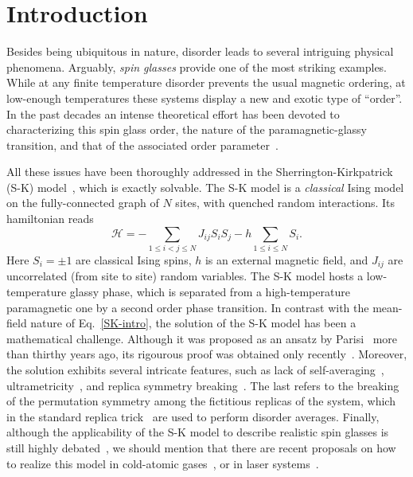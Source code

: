 \documentclass[twocolumn,superscriptaddress,prb,10pt]{revtex4-1}
\begin{document}
\section{Introduction}


Besides being ubiquitous in nature, disorder leads to several intriguing 
physical phenomena. Arguably, \emph{spin glasses} provide one of the most 
striking examples. While at any finite temperature disorder prevents the 
usual magnetic ordering, at low-enough temperatures these systems display a 
new and exotic type of ``order''. In the past decades an intense theoretical 
effort has been devoted to characterizing this spin glass order, the nature of 
the paramagnetic-glassy transition, and that of the associated order 
parameter~\cite{binder-1986,parisi-book,young-1998,nishimori-book,castellani-2005}. 

All these issues have been thoroughly addressed in the Sherrington-Kirkpatrick 
(S-K) model~\cite{sherrington-1978,sherrington-1978-prl}, which is exactly 
solvable. The S-K model is a \emph{classical} Ising model on the fully-connected 
graph of $N$ sites, with quenched random interactions. Its hamiltonian reads  
%
\begin{equation}
{\mathcal H}=-\sum\limits_{1\le i<j\le N}J_{ij}S_i S_j-
h\sum\limits_{1\le i\le N}S_i.
\label{SK-intro}
\end{equation}
%
Here $S_i=\pm 1$ are classical Ising spins, $h$ is an external magnetic field, and 
$J_{ij}$ are uncorrelated (from site to site) random variables. The S-K model hosts 
a low-temperature glassy phase, which is separated from a high-temperature paramagnetic 
one by a second order phase transition. In contrast with the mean-field nature of 
Eq.~\eqref{SK-intro}, the solution of the S-K model has been a mathematical challenge. 
Although it was proposed as an ansatz by Parisi~\cite{parisi-1980} more than thirthy 
years ago, its rigourous proof was obtained only recently~\cite{talagrand-2006}. Moreover, 
the solution exhibits several intricate features, such as lack of self-averaging~\cite{pastur-1991}, 
ultrametricity~\cite{mezard-1984,rammal-1986}, and replica symmetry breaking~\cite{parisi-book,
castellani-2005}. The last refers to the breaking of the permutation symmetry among the 
fictitious replicas of the system, which in the standard replica trick~\cite{cardy-book} are 
used to perform disorder averages. Finally, although the applicability of the S-K 
model to describe realistic spin glasses is still highly debated~\cite{yucesoy-2012,
billoire-2012,yucesoy-2013}, we should mention that there are recent proposals on how to 
realize this model in cold-atomic gases~\cite{morrison-2008,rotondo-2015}, or in laser 
systems~\cite{ghofraniha-2015}. 
\end{document}
